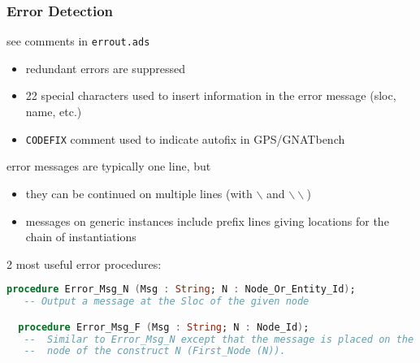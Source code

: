 \documentclass{beamer}
\newcommand{\vs}{\vspace{0.5cm}}
\newenvironment{specialframe}{%
  \begin{frame}[fragile,environment=specialframe]}{\end{frame}}
\begin{document}
\begin{specialframe}
  \frametitle{Error Detection}

see comments in \verb|errout.ads|

\begin{itemize}
\item redundant errors are suppressed
\item
  22 special characters used to insert information in the error message (sloc,
  name, etc.)
\item \verb|CODEFIX| comment used to indicate autofix in GPS/GNATbench
\end{itemize}

\vs

error messages are typically one line, but
\begin{itemize}
\item they can be continued on multiple lines (with $\backslash$ and $\backslash\backslash$)
\item messages on generic instances include prefix lines giving locations for
  the chain of instantiations
\end{itemize}

\vs

2 most useful error procedures:
\vspace{-0.5cm}
\begin{lstlisting}[language=ada]
  procedure Error_Msg_N (Msg : String; N : Node_Or_Entity_Id);
   -- Output a message at the Sloc of the given node

  procedure Error_Msg_F (Msg : String; N : Node_Id);
   --  Similar to Error_Msg_N except that the message is placed on the first
   --  node of the construct N (First_Node (N)).
\end{lstlisting}
\end{specialframe}
\end{document}
